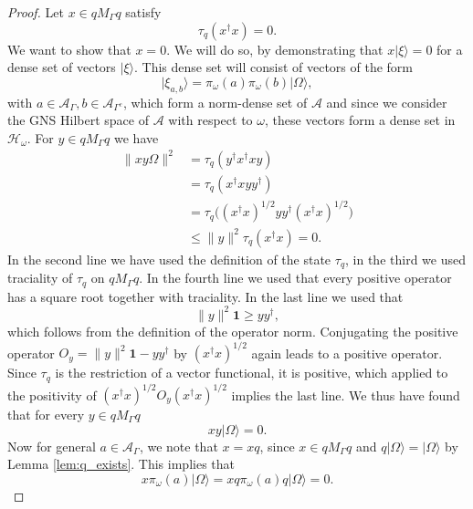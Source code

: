 \documentclass[aps,pra,reprint,superscriptaddress]{revtex4-2}
\newcommand{\cA}{{\mathcal A}}
\newcommand{\cH}{{\mathcal H}}
\newcommand\G{\Gamma}
\renewcommand\t{\tau}
\newcommand\w{\omega}
\newcommand\W{\Omega}
\newcommand\x{\xi}
\newcommand{\id}{\mathbf 1}
\providecommand{\ket}[1]{\lvert #1\rangle}
\providecommand{\norm}[1]{\lVert #1\rVert}
\theoremstyle{definition}
\theoremstyle{remark}
\begin{document}
\begin{proof}
Let $x\in q M_\G q$ satisfy
\begin{equation}
  \tau_q(x^\dagger x)=0.
  \label{eq:faithfulness-zero}
\end{equation}
We want to show that $x = 0$. We will do so, by demonstrating that $x \ket{\x}
= 0$ for a dense set of vectors $\ket{\x}$. This dense set 
will consist of vectors of the form
\begin{equation}\label{eq:dense_states}
    \ket{\x_{a,b}} = \pi_\w(a) \pi_\w(b) \ket{\W},
\end{equation}
 with $a \in \cA_\G, b \in \cA_{\G^c}$, which form a norm-dense set of $\cA$
 and since we consider the GNS Hilbert space of $\cA$ with respect to $\w$, these vectors form a
 dense set in $\cH_\w$.
For $y\in qM_\G q$ we have 
\begin{align}\label{eq:xyOmega_zero}
    \norm{xy\Omega}^2
  &=\tau_q(y^\dagger x^\dagger xy)\\
  \nonumber
  &=\tau_q(x^\dagger xy y^\dagger)\\
   \nonumber
  &=\tau_q\big((x^\dagger x)^{1/2}yy^\dagger(x^\dagger x)^{1/2}\big)\\
   \nonumber
  &\le \|y\|^2\tau_q(x^\dagger x)=0.
   \nonumber
\end{align}
In the second line we have used the definition of the state $\t_q$, in the third we
used traciality of $\t_q$ on $q M_\G q$. In the fourth line we used that every
positive operator has a square root together with traciality. In the last
line we used that 
\begin{equation}
    \norm{y}^2 \id \geq y y^\dagger,
\end{equation}
which follows from the definition of the operator norm. Conjugating the
positive operator $ O_y = \norm{y}^2 \id - y y^\dagger$ by $(x^\dagger x)^{1/2}$ again leads to a
positive operator. Since $\t_q$ is the restriction of a vector functional, it
is positive, which applied to the positivity of
$(x^\dagger x)^{1/2}O_y(x^\dagger x)^{1/2}$ implies the last line.
We thus have found that for every $y\in qM_\G q$
\begin{equation}\label{eq:all_xyOmega_zero}
  xy\ket{\W}=0.
\end{equation}
Now for general $a\in \cA_\G$, we note that $x=xq$, since $x \in q M_\G q$
and $q\ket{\W}=\ket{\W}$ by Lemma \ref{lem:q_exists}. This implies that
\begin{equation}\label{eq:x_a_zero}
  x\pi_\w(a)\ket{\W}
  =x q\pi_\w(a) q \ket{\W}=0.
\end{equation}

\end{proof}
\end{document}
